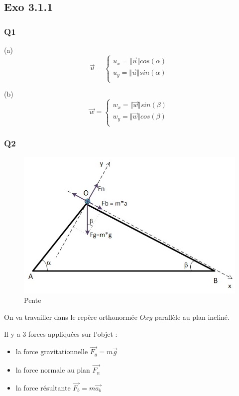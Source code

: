 \documentclass[]{book}
\theoremstyle{definition}
\begin{document}
\subsection*{Exo 3.1.1}
\subsubsection*{Q1}
(a) $$\overrightarrow{u} = 
\left\{ 
\begin{array}{l}
u_x = \Vert \overrightarrow{u} \Vert cos(\alpha) \\
u_y = \Vert \overrightarrow{u} \Vert sin(\alpha) \\
\end{array}
\right. 
$$

(b)
$$\overrightarrow{w} = 
\left\{ 
\begin{array}{l}
w_x = \Vert \overrightarrow{w} \Vert sin(\beta) \\
w_y = \Vert \overrightarrow{w} \Vert cos(\beta) \\
\end{array}
\right. 
$$

\subsubsection*{Q2}
\begin{figure}[h!]
  \includegraphics[width=0.8\linewidth]{exo3_1_1_pente.jpg}
  \caption{Pente}
\end{figure}

On va travailler dans le rep\`ere orthonorm\'ee $Oxy$ parall\`ele au plan inclin\'e.

Il y a 3 forces appliqu\'ees sur l'objet :
\begin{itemize}
\item la force gravitationnelle $\overrightarrow{F_g} = m\overrightarrow{g}$
\item la force normale au plan $\overrightarrow{F_n}$ 
\item la force r\'esultante $\overrightarrow{F_b} = m\overrightarrow{a_b}$
\end{itemize}
\end{document}
